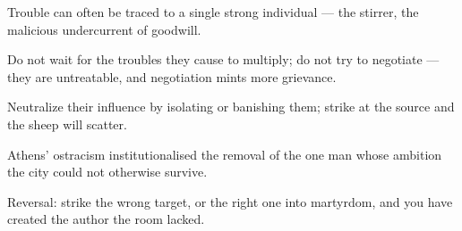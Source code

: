 

\begin{distilled}
  \item Trouble can often be traced to a single strong individual --- the stirrer, the malicious undercurrent of goodwill.
  \item Do not wait for the troubles they cause to multiply; do not try to negotiate --- they are untreatable, and negotiation mints more grievance.
  \item Neutralize their influence by isolating or banishing them; strike at the source and the sheep will scatter.
  \item Athens' ostracism institutionalised the removal of the one man whose ambition the city could not otherwise survive.
  \item Reversal: strike the wrong target, or the right one into martyrdom, and you have created the author the room lacked.
\end{distilled}

